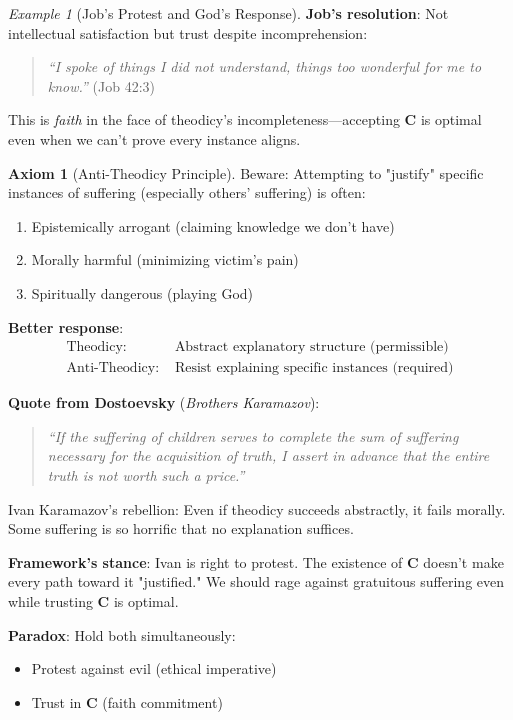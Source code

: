 \documentclass[11pt,a4paper]{article}
\theoremstyle{definition}
\newtheorem{axiom}{Axiom}[section]
\theoremstyle{remark}
\newtheorem{example}{Example}[section]
\begin{document}
\begin{small}
\begin{enumerate}
\begin{example}[Job's Protest and God's Response]
\textbf{Job's resolution}: Not intellectual satisfaction but trust despite incomprehension:
\begin{quote}
\textit{``I spoke of things I did not understand, things too wonderful for me to know.''} (Job 42:3)
\end{quote}

This is \textit{faith} in the face of theodicy's incompleteness—accepting \(\mathbf{C}\) is optimal even when we can't prove every instance aligns.
\end{example}

\begin{axiom}[Anti-Theodicy Principle]
Beware: Attempting to "justify" specific instances of suffering (especially others' suffering) is often:
\begin{enumerate}
    \item Epistemically arrogant (claiming knowledge we don't have)
    \item Morally harmful (minimizing victim's pain)
    \item Spiritually dangerous (playing God)
\end{enumerate}

\textbf{Better response}:
\begin{align}
\text{Theodicy: } &\text{Abstract explanatory structure (permissible)} \\
\text{Anti-Theodicy: } &\text{Resist explaining specific instances (required)}
\end{align}

\textbf{Quote from Dostoevsky} (\textit{Brothers Karamazov}):
\begin{quote}
\textit{``If the suffering of children serves to complete the sum of suffering necessary for the acquisition of truth, I assert in advance that the entire truth is not worth such a price.''}
\end{quote}

Ivan Karamazov's rebellion: Even if theodicy succeeds abstractly, it fails morally. Some suffering is so horrific that no explanation suffices.

\textbf{Framework's stance}: Ivan is right to protest. The existence of \(\mathbf{C}\) doesn't make every path toward it "justified." We should rage against gratuitous suffering even while trusting \(\mathbf{C}\) is optimal.

\textbf{Paradox}: Hold both simultaneously:
\begin{itemize}
    \item Protest against evil (ethical imperative)
    \item Trust in \(\mathbf{C}\) (faith commitment)
\end{itemize}


\end{axiom}
\end{enumerate}
\end{small}
\end{document}
